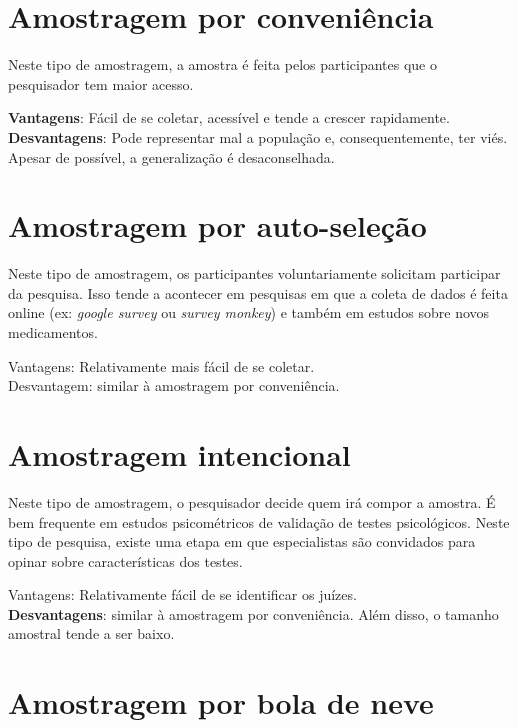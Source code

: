 \documentclass[
]{book}
\begin{document}
\hypertarget{amostragem-por-conveniuxeancia}{%
\section{Amostragem por conveniência}\label{amostragem-por-conveniuxeancia}}

Neste tipo de amostragem, a amostra é feita pelos participantes que o pesquisador tem maior acesso.

\textbf{Vantagens}: Fácil de se coletar, acessível e tende a crescer rapidamente.\\
\textbf{Desvantagens}: Pode representar mal a população e, consequentemente, ter viés. Apesar de possível, a generalização é desaconselhada.

\hypertarget{amostragem-por-auto-seleuxe7uxe3o}{%
\section{Amostragem por auto-seleção}\label{amostragem-por-auto-seleuxe7uxe3o}}

Neste tipo de amostragem, os participantes voluntariamente solicitam participar da pesquisa. Isso tende a acontecer em pesquisas em que a coleta de dados é feita online (ex: \emph{google survey} ou \emph{survey monkey}) e também em estudos sobre novos medicamentos.

Vantagens: Relativamente mais fácil de se coletar.\\
Desvantagem: similar à amostragem por conveniência.

\hypertarget{amostragem-intencional}{%
\section{Amostragem intencional}\label{amostragem-intencional}}

Neste tipo de amostragem, o pesquisador decide quem irá compor a amostra. É bem frequente em estudos psicométricos de validação de testes psicológicos. Neste tipo de pesquisa, existe uma etapa em que especialistas são convidados para opinar sobre características dos testes.

Vantagens: Relativamente fácil de se identificar os juízes.\\
\textbf{Desvantagens}: similar à amostragem por conveniência. Além disso, o tamanho amostral tende a ser baixo.

\hypertarget{amostragem-por-bola-de-neve}{%
\section{Amostragem por bola de neve}\label{amostragem-por-bola-de-neve}}
\end{document}
